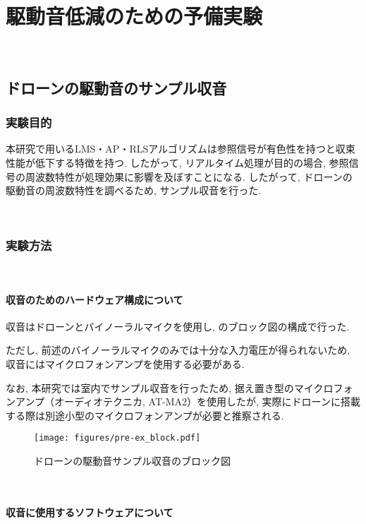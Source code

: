 \
\chapter{駆動音低減のための予備実験}\label{noise-pre-experiment}

\
\section{ドローンの駆動音のサンプル収音}\label{record-drone}

\subsection{実験目的}\label{purpose-drone}

本研究で用いるLMS・AP・RLSアルゴリズムは参照信号が有色性を持つと収束性能が低下する特徴を持つ. したがって, リアルタイム処理が目的の場合, 参照信号の周波数特性が処理効果に影響を及ぼすことになる. したがって, ドローンの駆動音の周波数特性を調べるため, サンプル収音を行った. 

\
\subsection{実験方法}\label{instruction-drone}

\
\subsubsection{収音のためのハードウェア構成について}\label{hardware-for-record}

収音はドローンとバイノーラルマイクを使用し, のブロック図の構成で行った. 

ただし, 前述のバイノーラルマイクのみでは十分な入力電圧が得られないため, 収音にはマイクロフォンアンプを使用する必要がある. 

なお, 本研究では室内でサンプル収音を行ったため, 据え置き型のマイクロフォンアンプ（オーディオテクニカ, AT-MA2）を使用したが, 実際にドローンに搭載する際は別途小型のマイクロフォンアンプが必要と推察される. 
\begin{figure}[H]
\centering
\texttt{[image: figures/pre-ex\_block.pdf]}
\caption{ドローンの駆動音サンプル収音のブロック図}
\label{fig:pre-ex_block}
\end{figure}

\
\subsubsection{収音に使用するソフトウェアについて}\label{software-for-record}

